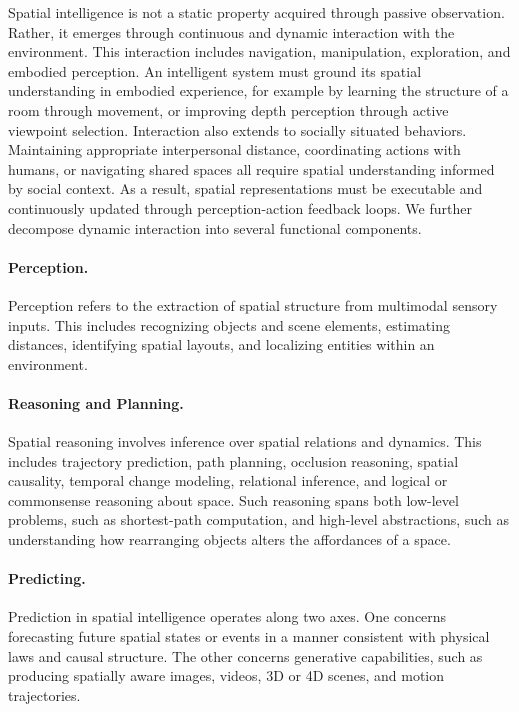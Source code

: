 Spatial intelligence is not a static property acquired through passive observation.
Rather, it emerges through continuous and dynamic interaction with the environment.
This interaction includes navigation, manipulation, exploration, and embodied perception.
An intelligent system must ground its spatial understanding in embodied experience, for example by learning the structure of a room through movement, or improving depth perception through active viewpoint selection.
Interaction also extends to socially situated behaviors.
Maintaining appropriate interpersonal distance, coordinating actions with humans, or navigating shared spaces all require spatial understanding informed by social context.
As a result, spatial representations must be executable and continuously updated through perception-action feedback loops.
We further decompose dynamic interaction into several functional components.



\paragraph{Perception.}
Perception refers to the extraction of spatial structure from multimodal sensory inputs.
This includes recognizing objects and scene elements, estimating distances, identifying spatial layouts, and localizing entities within an environment.

\paragraph{Reasoning and Planning.}
Spatial reasoning involves inference over spatial relations and dynamics.
This includes trajectory prediction, path planning, occlusion reasoning, spatial causality, temporal change modeling, relational inference, and logical or commonsense reasoning about space.
Such reasoning spans both low-level problems, such as shortest-path computation, and high-level abstractions, such as understanding how rearranging objects alters the affordances of a space.

\paragraph{Predicting.}
Prediction in spatial intelligence operates along two axes.
One concerns forecasting future spatial states or events in a manner consistent with physical laws and causal structure.
The other concerns generative capabilities, such as producing spatially aware images, videos, 3D or 4D scenes, and motion trajectories.

